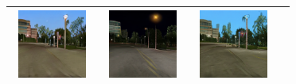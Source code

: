 \documentclass{VUMIFPSbakalaurinis}
\begin{document}
\begin{table}[H]
{\begin{tabular}{|c|c|c|c|}
            \includegraphics[width=100,height=85]{img/pvz/7_cycle_v2} & \includegraphics[width=100,height=85]{img/pvz/7_cut_v2} & \includegraphics[width=100,height=85]{img/pvz/7_mspc_v2}
            \\
            \hline
            \end{tabular}
        }
        \label{tab:table example}
    \end{table}
\end{document}
